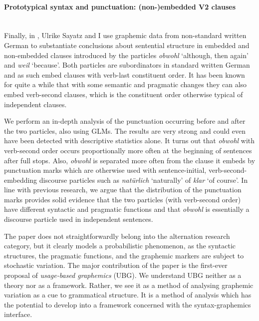 \paragraph[Prototypical syntax and punctuation]{Prototypical syntax and punctuation: (non-)embedded V2 clauses}
\mbox{}\\[0.5\baselineskip]\noindent
Finally, in \ROWeil, Ulrike Sayatz and I use graphemic data from non-standard written German to substantiate conclusions about sentential structure in embedded and non-embedded clauses introduced by the particles \textit{obwohl} `although, then again' and \textit{weil} `because'.
Both particles are subordinators in standard written German and as such embed clauses with verb-last constituent order.
It has been known for quite a while that with some semantic and pragmatic changes they can also embed verb-second clauses, which is the constituent order otherwise typical of independent clauses.

We perform an in-depth analysis of the punctuation occurring before and after the two particles, also using GLMs.
The results are very strong and could even have been detected with descriptive statistics alone.
It turns out that \textit{obwohl} with verb-second order occurs proportionally more often at the beginning of sentences after full stops.
Also, \textit{obwohl} is separated more often from the clause it embeds by punctuation marks which are otherwise used with sentence-initial, verb-second-embedding discourse particles such as \textit{natürlich} `naturally' of \textit{klar} `of course'.
In line with previous research, we argue that the distribution of the punctuation marks provides solid evidence that the two particles (with verb-second order) have different syntactic and pragmatic functions and that \textit{obwohl} is essentially a discourse particle used in independent sentences.

The paper does not straightforwardly belong into the alternation research category, but it clearly models a probabilistic phenomenon, as the syntactic structures, the pragmatic functions, and the graphemic markers are subject to stochastic variation.
The major contribution of the paper is the first-ever proposal of \textit{usage-based graphemics} (UBG).
We understand UBG neither as a theory nor as a framework.
Rather, we see it as a method of analysing graphemic variation as a cue to grammatical structure.
It is a method of analysis which has the potential to develop into a framework concerned with the syntax-graphemics interface.

